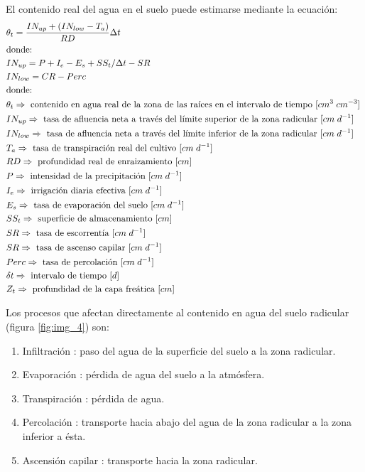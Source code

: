El contenido real del agua en el suelo puede estimarse mediante la ecuación:
\begin{align*}
	&\theta_t = \frac{IN_{up}+(IN_{low}-T_a)}{RD}\Delta t \\
	&\text{donde: } \\
	&IN_{up}=P+I_e-E_s+SS_t/\Delta t - SR \\
	&IN_{low}=CR-Perc \\
	&\text{donde: } \\
	&\theta_t  \Rightarrow \text{ contenido en agua real de la zona de las raíces en el intervalo de tiempo [$ cm^3 \; cm^{-3} $] } \\
	&IN_{up} \Rightarrow \text{ tasa de afluencia neta a través del límite superior de la zona radicular [$ cm \; d^{-1} $]} \\
	&IN_{low} \Rightarrow \text{ tasa de afluencia neta a través del límite inferior de la zona radicular [$ cm \; d^{-1} $]} \\
	&T_a \Rightarrow \text{ tasa de transpiración real del cultivo [$ cm \; d^{-1} $]} \\
	&RD \Rightarrow \text{ profundidad real de enraizamiento  [$ cm $]} \\
	&P \Rightarrow \text{ intensidad de la precipitación  [$ cm \; d^{-1} $]} \\
	&I_e \Rightarrow \text{ irrigación diaria efectiva  [$ cm \; d^{-1} $]} \\
	&E_s \Rightarrow \text{ tasa de evaporación del suelo [$ cm \; d^{-1} $]} \\
	&SS_t \Rightarrow \text{ superficie de almacenamiento [$ cm $]} \\
	&SR \Rightarrow \text{ tasa de escorrentía [$ cm \; d^{-1} $]} \\
	&SR \Rightarrow \text{ tasa de ascenso capilar [$ cm \; d^{-1} $]} \\
	&Perc \Rightarrow \text{ tasa de percolación [$ cm \; d^{-1} $]} \\
	&\delta t \Rightarrow \text{ intervalo de tiempo [$ d $]} \\
	&Z_t \Rightarrow \text{ profundidad de la capa freática [$ cm $]} \\
\end{align*}

Los procesos que afectan directamente al contenido en agua del suelo radicular (figura \ref{fig:img_4}) son:
\begin{enumerate}
	\item Infiltración : paso del agua de la superficie del suelo a la zona radicular.
	\item Evaporación : pérdida de agua del suelo a la atmósfera.
	\item Transpiración : pérdida de agua.
	\item Percolación : transporte hacia abajo del agua de la zona radicular a la zona inferior a ésta.
	\item Ascensión capilar : transporte hacia la zona radicular.
\end{enumerate}


